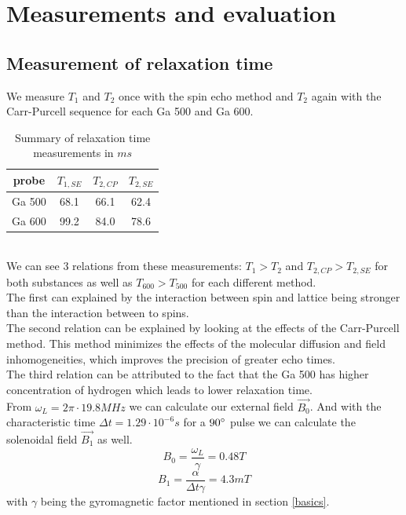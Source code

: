 \section{Measurements and evaluation}\label{measurements-and-evaluation}

\subsection{Measurement of relaxation time}\label{relaxation-time}

We measure $T_1$ and $T_2$ once with the spin echo method and $T_2$ again with the Carr-Purcell sequence for each Ga 500 and Ga 600.
\begin{table}[h!]
\centering
\begin{tabular}{c||c|c|c}
probe  &  $T_{1,SE}$ & $T_{2,CP}$ & $T_{2,SE}$ \\
\hline
\hline
Ga 500 & 68.1 & 66.1 & 62.4 \\
\hline
Ga 600 & 99.2 & 84.0 & 78.6 \\
\end{tabular}
\caption{Summary of relaxation time measurements in $ms$}
\label{table1}
\end{table}\\
We can see 3 relations from these measurements: $T_{1} > T_{2}$ and $T_{2,CP} > T_{2,SE}$ for both substances as well as $T_{600} > T_{500}$ for each different method.\\
The first can explained by the interaction between spin and lattice being stronger than the interaction between to spins.\\
The second relation can be explained by looking at the effects of the Carr-Purcell method. This method minimizes the effects of the molecular diffusion and field inhomogeneities, which improves the precision of greater echo times.\\
The third relation can be attributed to the fact that the Ga 500 has higher concentration of hydrogen which leads to lower relaxation time.\\
From $\omega_L = 2\pi\cdot19.8 MHz  $ we can calculate our external field $\vec{B_0}$. And with the characteristic time $\Delta t = 1.29\cdot 10^{-6}s $ for a $90\degree$ pulse we can calculate the solenoidal field $\vec{B_1}$ as well.
\begin{equation}
	B_0 = \dfrac{\omega_L}{\gamma} = 0.48 T
\end{equation}
\begin{equation}
	B_1 = \dfrac{\alpha}{\Delta t \gamma} = 4.3 mT
\end{equation}
with $\gamma$ being the gyromagnetic factor mentioned in section \ref{basics}.\\

